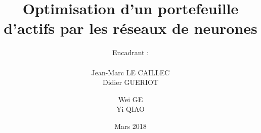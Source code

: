 \documentclass{article}
\author{Wei GE \\ Yi QIAO}
\date{Mars 2018}
\title{Optimisation d’un portefeuille d’actifs par les réseaux de neurones}
\subtitle{Encadrant : \\   \\ Jean-Marc LE CAILLEC \\ Didier GUERIOT}
\begin{document}
\imtaMaketitlepage

\tableofcontents

\newpage



\newpage


 
\newpage


 

\newpage
 

 
\newpage
 

\end{document}
